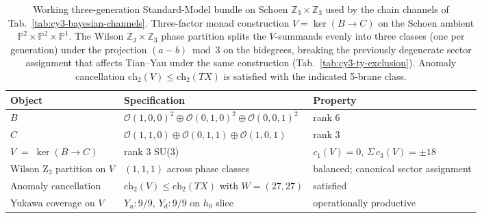 \begin{table}[t]
\centering
\caption{Working three-generation Standard-Model bundle on Schoen $\mathbb{Z}_3 \times \mathbb{Z}_3$ used by the chain channels of Tab.~\ref{tab:cy3-bayesian-channels}. Three-factor monad construction $V = \ker(B \to C)$ on the Schoen ambient $\mathbb{P}^2 \times \mathbb{P}^2 \times \mathbb{P}^1$. The Wilson $\mathbb{Z}_3 \times \mathbb{Z}_3$ phase partition splits the $V$-summands evenly into three classes (one per generation) under the projection $(a-b) \bmod 3$ on the bidegrees, breaking the previously degenerate sector assignment that affects Tian--Yau under the same construction (Tab.~\ref{tab:cy3-ty-exclusion}). Anomaly cancellation $\mathrm{ch}_2(V) \le \mathrm{ch}_2(TX)$ is satisfied with the indicated 5-brane class.}
\label{tab:cy3-schoen-bundle}
\begin{ruledtabular}
\begin{tabular}{lll}
Object & Specification & Property \\
\hline
$B$ & $\mathcal{O}(1,0,0)^2 \oplus \mathcal{O}(0,1,0)^2 \oplus \mathcal{O}(0,0,1)^2$ & rank $6$ \\
$C$ & $\mathcal{O}(1,1,0) \oplus \mathcal{O}(0,1,1) \oplus \mathcal{O}(1,0,1)$  & rank $3$ \\
$V \;=\; \ker(B \to C)$ & rank $3$ SU(3) & $c_1(V) = 0$, $\Sigma\,c_3(V) = \pm 18$ \\
Wilson Z$_3$ partition on $V$ & $(1,1,1)$ across phase classes & balanced; canonical sector assignment \\
Anomaly cancellation & $\mathrm{ch}_2(V) \le \mathrm{ch}_2(TX)$ with $W=(27,27)$ & satisfied \\
Yukawa coverage on $V$ & $Y_u : 9/9$, $Y_d : 9/9$ on $h_0$ slice & operationally productive \\
\end{tabular}
\end{ruledtabular}
\end{table}
